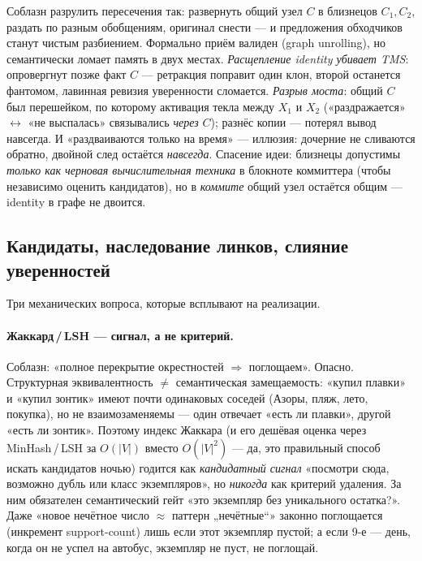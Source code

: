 \begin{pitfall}
Соблазн разрулить пересечения так: развернуть общий узел $C$ в близнецов $C_1,C_2$,
раздать по разным обобщениям, оригинал снести — и предложения обходчиков станут чистым
разбиением. Формально приём валиден (graph unrolling), но семантически ломает память в
двух местах. \emph{Расщепление identity убивает TMS}: опровергнут позже факт $C$ —
ретракция поправит один клон, второй останется фантомом, лавинная ревизия уверенности
сломается. \emph{Разрыв моста}: общий $C$ был перешейком, по которому активация текла
между $X_1$ и $X_2$ («раздражается» $\leftrightarrow$ «не выспалась» связывались
\emph{через} $C$); разнёс копии — потерял вывод навсегда. И «раздваиваются только на
время» — иллюзия: дочерние не сливаются обратно, двойной след остаётся \emph{навсегда}.
Спасение идеи: близнецы допустимы \emph{только как черновая вычислительная техника} в
блокноте коммиттера (чтобы независимо оценить кандидатов), но в \emph{коммите} общий
узел остаётся общим — identity в графе не двоится.
\end{pitfall}

\subsection{Кандидаты, наследование линков, слияние уверенностей}
\label{sec:consolidation-mechanics}

Три механических вопроса, которые всплывают на реализации.

\paragraph{Жаккард\,/\,LSH — сигнал, а не критерий.} Соблазн: «полное перекрытие
окрестностей $\Rightarrow$ поглощаем». Опасно. Структурная эквивалентность $\ne$
семантическая замещаемость: «купил плавки» и «купил зонтик» имеют почти одинаковых
соседей (Азоры, пляж, лето, покупка), но не взаимозаменяемы — один отвечает «есть ли
плавки», другой «есть ли зонтик». Поэтому индекс Жаккара (и его дешёвая оценка через
MinHash\,/\,LSH за $O(|V|)$ вместо $O(|V|^2)$ — да, это правильный способ искать
кандидатов ночью) годится как \emph{кандидатный сигнал} «посмотри сюда, возможно дубль
или класс экземпляров», но \emph{никогда} как критерий удаления. За ним обязателен
семантический гейт «это экземпляр без уникального остатка?». Даже «новое нечётное число
$\approx$ паттерн „нечётные“» законно поглощается (инкремент support-count) лишь если
этот экземпляр пустой; а если 9-е — день, когда он не успел на автобус, экземпляр не
пуст, не поглощай.

